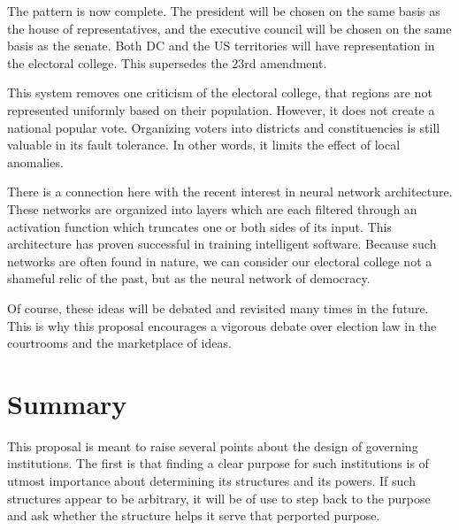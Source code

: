 \documentclass{article}
\begin{document}
The pattern is now complete. The president will be chosen on the same basis as the house of representatives, and the executive council will be chosen on the same basis as the senate. Both DC and the US territories will have representation in the electoral college. This supersedes the 23rd amendment.

This system removes one criticism of the electoral college, that regions are not represented uniformly based on their population. However, it does not create a national popular vote. Organizing voters into districts and constituencies is still valuable in its fault tolerance. In other words, it limits the effect of local anomalies.

There is a connection here with the recent interest in neural network architecture. These networks are organized into layers which are each filtered through an activation function which truncates one or both sides of its input. This architecture has proven successful in training intelligent software. Because such networks are often found in nature, we can consider our electoral college not a shameful relic of the past, but as the neural network of democracy.

Of course, these ideas will be debated and revisited many times in the future. This is why this proposal encourages a vigorous debate over election law in the courtrooms and the marketplace of ideas.

\section{Summary}

This proposal is meant to raise several points about the design of governing institutions. The first is that finding a clear purpose for such institutions is of utmost importance about determining its structures and its powers. If such structures appear to be arbitrary, it will be of use to step back to the purpose and ask whether the structure helps it serve that perported purpose.
\end{document}
